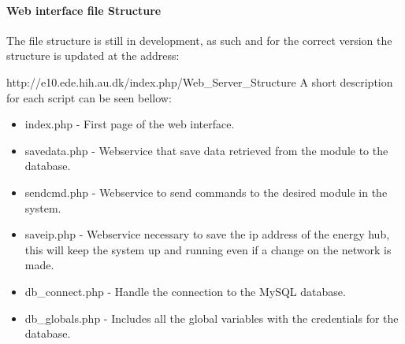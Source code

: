 \paragraph{Web interface file Structure}
The file structure is still in development, as such and for the correct version the structure is updated at the address: 

http://e10.ede.hih.au.dk/index.php/Web\_Server\_Structure
%
A short description for each script can be seen bellow:
\begin{itemize}
	\item index.php - First page of the web interface.
	\item savedata.php - Webservice that save data retrieved from the module to the database.
	\item sendcmd.php - Webservice to send commands to the desired module in the system.
	\item saveip.php - Webservice necessary to save the ip address of the energy hub, this will keep the system up and running even if a change on the network is made.
	\item db\_connect.php - Handle the connection to the MySQL database.
	\item db\_globals.php - Includes all the global variables with the credentials for the database.
\end{itemize}

